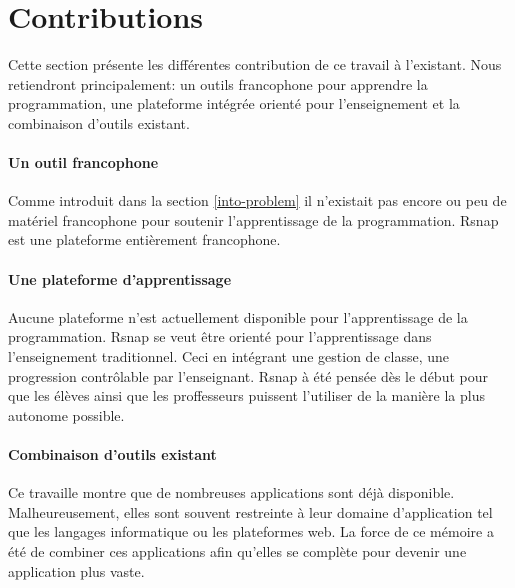 \section{Contributions}
\label{intro-contribution}
Cette section présente les différentes contribution de ce travail à l'existant. Nous retiendront principalement: un outils francophone pour apprendre la programmation, une plateforme intégrée orienté pour l'enseignement et la combinaison d'outils existant.

\paragraph{Un outil francophone} Comme introduit dans la section \ref{into-problem} il n'existait pas encore ou peu de matériel francophone pour soutenir l'apprentissage de la programmation. \gls{Rsnap} est une plateforme entièrement francophone.%

\paragraph{Une plateforme d'apprentissage} Aucune plateforme n'est actuellement disponible pour l'apprentissage de la programmation. \gls{Rsnap} se veut être orienté pour l'apprentissage dans l'enseignement traditionnel. Ceci en intégrant une gestion de classe, une progression contrôlable par l'enseignant. \gls{Rsnap} à été pensée dès le début pour que les élèves ainsi que les proffesseurs puissent l'utiliser de la manière la plus autonome possible.

\paragraph{Combinaison d'outils existant} Ce travaille montre que de nombreuses applications sont déjà disponible. Malheureusement, elles sont souvent restreinte à leur domaine d'application tel que les langages informatique ou les plateformes web. La force de ce mémoire a été de combiner ces applications afin qu'elles se complète pour devenir une application plus vaste.


%
%
%
%
%
%
%
%
%
